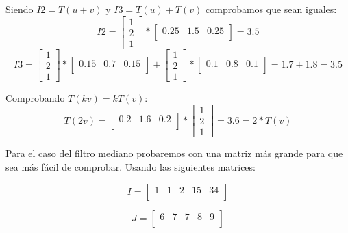 \documentclass{article}
\begin{document}
Siendo $ I2 = T(u + v)$  y $I3 = T(u) + T(v)$ comprobamos que sean iguales:
\begin{equation}
I2 = \begin{bmatrix}
1 \\ 
2 \\ 
1
\end{bmatrix}*\begin{bmatrix}
0.25 & 1.5 & 0.25 \\ 
\end{bmatrix}=3.5
\end{equation}
\begin{equation}
I3 = \begin{bmatrix}
1 \\ 
2 \\ 
1
\end{bmatrix}*\begin{bmatrix}
0.15 & 0.7 & 0.15 \\ 
\end{bmatrix}+\begin{bmatrix}
1 \\ 
2 \\ 
1
\end{bmatrix}*\begin{bmatrix}
0.1 & 0.8 & 0.1 \\ 
\end{bmatrix}= 1.7 + 1.8 = 3.5
\end{equation}

Comprobando $T(kv) = kT(v)$:
\begin{equation}
T(2v) = \begin{bmatrix}
0.2 & 1.6 & 0.2 \\ 
\end{bmatrix}*\begin{bmatrix}
1 \\ 
2 \\ 
1
\end{bmatrix}=3.6 = 2* T(v)
\end{equation}

Para el caso del filtro mediano probaremos con una matriz más grande para que sea más fácil de comprobar. Usando las siguientes matrices:

\begin{equation}
I = \begin{bmatrix}
1 & 1 & 2 & 15 & 34 \\ 
\end{bmatrix}
\end{equation}

\begin{equation}
J = \begin{bmatrix}
6 & 7 & 7 & 8 & 9 \\ 
\end{bmatrix}
\end{equation}
\end{document}
